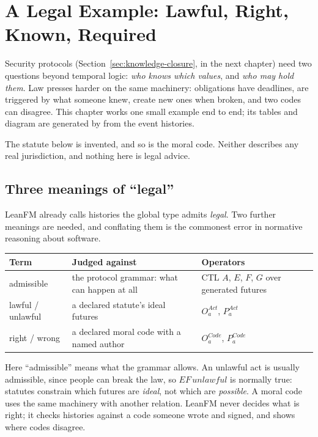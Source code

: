 \chapter{A Legal Example: Lawful, Right, Known, Required}
\label{ch:legal-example}

Security protocols (Section~\ref{sec:knowledge-closure}, in the next chapter) need
two questions beyond temporal logic: \emph{who knows which values}, and \emph{who
may hold them}. Law presses harder on
the same machinery: obligations have deadlines, are triggered by what someone knew,
create new ones when broken, and two codes can disagree. This chapter works one
small example end to end; its tables and diagram are generated by
 from the event histories.

The statute below is invented, and so is the moral code. Neither describes any
real jurisdiction, and nothing here is legal advice.

\section{Three meanings of ``legal''}

LeanFM already calls histories the global type admits \emph{legal}. Two further
meanings are needed, and conflating them is the commonest error in normative
reasoning about software.

\begin{center}
\begin{tabular}{@{}p{}p{}p{}@{}}
\toprule
Term & Judged against & Operators \\
\midrule
admissible & the protocol grammar: what can happen at all & CTL $A$, $E$, $F$, $G$ over generated futures \\
lawful / unlawful & a declared statute's ideal futures & $O^{Act}_a$, $P^{Act}_a$ \\
right / wrong & a declared moral code with a named author & $O^{Code}_a$, $P^{Code}_a$ \\
\bottomrule
\end{tabular}
\end{center}

Here ``admissible'' means what the grammar allows. An unlawful act is usually
admissible, since people can break the law, so $EF\,\mathit{unlawful}$ is normally
true: statutes constrain which futures are \emph{ideal}, not which are
\emph{possible}. A moral code uses the same machinery with another relation.
LeanFM never decides what is right; it checks histories against a code someone
wrote and signed, and shows where codes disagree.

